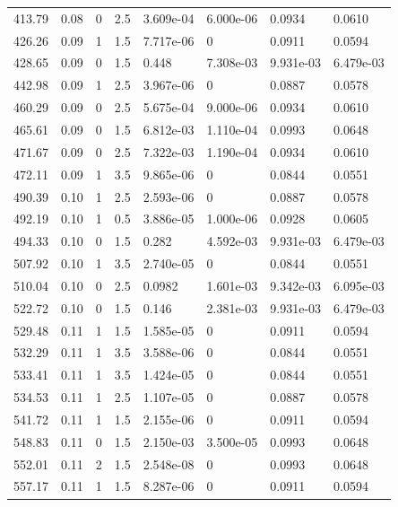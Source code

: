 \documentclass[preview]{standalone}
\begin{document}
{{{\begin{tabular}{L{1.2cm}C{1.2cm} C{0.3cm}C{0.5cm} C{1.4cm}C{1.4cm} C{1.4cm}C{1.4cm}}
  413.79  &  0.08  & 0     & 2.5 &  3.609e-04  & 6.000e-06  & 0.0934 &  0.0610   \\ 
  426.26  &  0.09  & 1     & 1.5 &  7.717e-06  & 0  & 0.0911 &  0.0594   \\ 
  428.65  &  0.09  & 0     & 1.5 &  0.448  & 7.308e-03  & 9.931e-03 &  6.479e-03   \\ 
  442.98  &  0.09  & 1     & 2.5 &  3.967e-06  & 0  & 0.0887 &  0.0578   \\ 
  460.29  &  0.09  & 0     & 2.5 &  5.675e-04  & 9.000e-06  & 0.0934 &  0.0610   \\ 
  465.61  &  0.09  & 0     & 1.5 &  6.812e-03  & 1.110e-04  & 0.0993 &  0.0648   \\ 
  471.67  &  0.09  & 0     & 2.5 &  7.322e-03  & 1.190e-04  & 0.0934 &  0.0610   \\ 
  472.11  &  0.09  & 1     & 3.5 &  9.865e-06  & 0  & 0.0844 &  0.0551   \\ 
  490.39  &  0.10  & 1     & 2.5 &  2.593e-06  & 0  & 0.0887 &  0.0578   \\ 
  492.19  &  0.10  & 1     & 0.5 &  3.886e-05  & 1.000e-06  & 0.0928 &  0.0605   \\ 
  494.33  &  0.10  & 0     & 1.5 &  0.282  & 4.592e-03  & 9.931e-03 &  6.479e-03   \\ 
  507.92  &  0.10  & 1     & 3.5 &  2.740e-05  & 0  & 0.0844 &  0.0551   \\ 
  510.04  &  0.10  & 0     & 2.5 &  0.0982  & 1.601e-03  & 9.342e-03 &  6.095e-03   \\ 
  522.72  &  0.10  & 0     & 1.5 &  0.146  & 2.381e-03  & 9.931e-03 &  6.479e-03   \\ 
  529.48  &  0.11  & 1     & 1.5 &  1.585e-05  & 0  & 0.0911 &  0.0594   \\ 
  532.29  &  0.11  & 1     & 3.5 &  3.588e-06  & 0  & 0.0844 &  0.0551   \\ 
  533.41  &  0.11  & 1     & 3.5 &  1.424e-05  & 0  & 0.0844 &  0.0551   \\ 
  534.53  &  0.11  & 1     & 2.5 &  1.107e-05  & 0  & 0.0887 &  0.0578   \\ 
  541.72  &  0.11  & 1     & 1.5 &  2.155e-06  & 0  & 0.0911 &  0.0594   \\ 
  548.83  &  0.11  & 0     & 1.5 &  2.150e-03  & 3.500e-05  & 0.0993 &  0.0648   \\ 
  552.01  &  0.11  & 2     & 1.5 &  2.548e-08  & 0  & 0.0993 &  0.0648   \\ 
  557.17  &  0.11  & 1     & 1.5 &  8.287e-06  & 0  & 0.0911 &  0.0594   \\ 

\end{tabular}}}}
\end{document}
